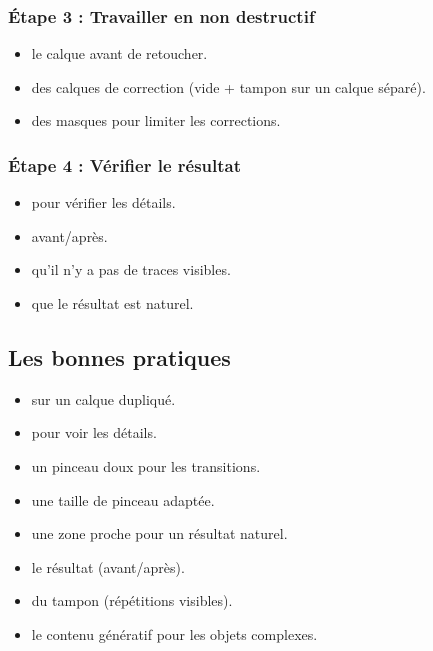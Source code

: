 \subsubsection{Étape 3 : Travailler en non destructif}

\begin{itemize}
    \item {} le calque avant de retoucher.
    \item {} des calques de correction (vide + tampon sur un calque séparé).
    \item {} des masques pour limiter les corrections.
\end{itemize}

\subsubsection{Étape 4 : Vérifier le résultat}

\begin{itemize}
    \item {} pour vérifier les détails.
    \item {} avant/après.
    \item {} qu'il n'y a pas de traces visibles.
    \item {} que le résultat est naturel.
\end{itemize}

\subsection{Les bonnes pratiques}

\begin{itemize}
    \item {} sur un calque dupliqué.
    \item {} pour voir les détails.
    \item {} un pinceau doux pour les transitions.
    \item {} une taille de pinceau adaptée.
    \item {} une zone proche pour un résultat naturel.
    \item {} le résultat (avant/après).
    \item {} du tampon (répétitions visibles).
    \item {} le contenu génératif pour les objets complexes.
\end{itemize}

